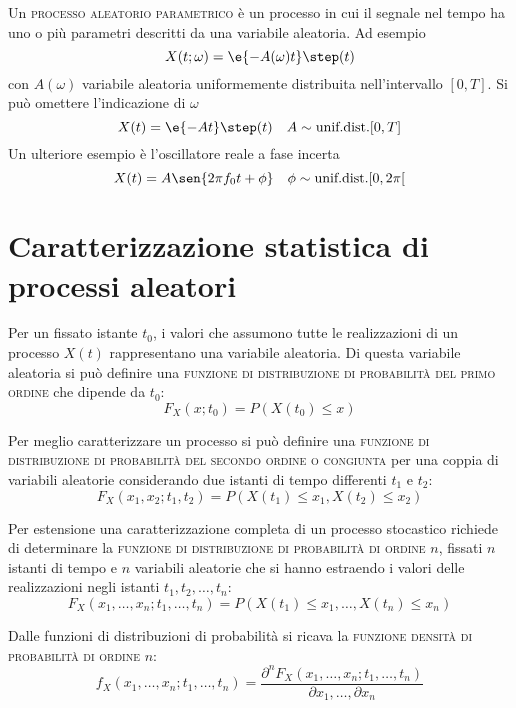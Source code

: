 Un \textsc{processo aleatorio parametrico} è un processo in cui il segnale nel tempo ha uno o più parametri descritti da una variabile aleatoria. Ad esempio
\[
	X(t;\omega)=\e{-A(\omega)t}\step(t)
\]
con $A(\omega)$ variabile aleatoria uniformemente distribuita nell'intervallo $[0,T]$.
Si può omettere l'indicazione di $\omega$
\[
	X(t)=\e{-A t}\step(t)\quad A\sim\text{unif.dist.}[0,T]
\]
Un ulteriore esempio è l'oscillatore reale a fase incerta
\[
	X(t)=A\sen{2\pi f_0 t+\phi}\quad \phi\sim\text{unif.dist.} [0,2\pi[
\]

\section{Caratterizzazione statistica di processi aleatori}
Per un fissato istante $t_0$, i valori che assumono tutte le realizzazioni di un processo $X(t)$ rappresentano una variabile aleatoria. Di questa variabile aleatoria si può definire una \textsc{funzione di distribuzione di probabilità del primo ordine} che dipende da $t_0$:
\begin{equation}
	F_X(x;t_0)=P(X(t_0)\leq x)
\end{equation}

Per meglio caratterizzare un processo si può definire una \textsc{funzione di distribuzione di probabilità del secondo ordine o congiunta} per una coppia di variabili aleatorie considerando due istanti di tempo differenti $t_1$ e $t_2$:
\begin{equation}
	F_X(x_1,x_2;t_1,t_2)=P(X(t_1)\leq x_1,X(t_2)\leq x_2)
\end{equation}

Per estensione una caratterizzazione completa di un processo stocastico richiede di determinare la \textsc{funzione di distribuzione di probabilità di ordine $n$}, fissati $n$ istanti di tempo e $n$ variabili aleatorie che si hanno estraendo i valori delle realizzazioni negli istanti $t_1,t_2,\dots,t_n$:
\begin{equation}
	F_X(x_1,\dots,x_n;t_1,\dots,t_n)=P(X(t_1)\leq x_1,\dots,X(t_n)\leq x_n)
\end{equation}

Dalle funzioni di distribuzioni di probabilità si ricava la \textsc{funzione densità di probabilità di ordine $n$}:
\begin{equation}
	f_X(x_1,\dots,x_n;t_1,\dots,t_n)=\frac{\partial^n F_X(x_1,\dots,x_n;t_1,\dots,t_n)}{\partial x_1,\dots,\partial x_n}
\end{equation}


